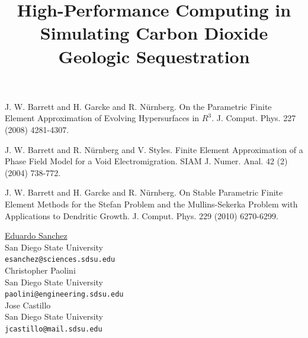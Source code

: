 \documentclass[article, A4, 11pt]{llncs}%
\begin{document}

\begin{thebibliography}{10}
{\sc J. W. Barrett and H. Garcke and R. N\"{u}rnberg}. {On the Parametric Finite Element Approximation of Evolving Hypersurfaces in ${R}^3$}. J. Comput. Phys. 227 (2008) 4281-4307.

{\sc J. W. Barrett and R. N\"{u}rnberg and V. Styles}. {Finite Element Approximation of a Phase Field Model for a Void Electromigration}. SIAM J. Numer. Anal.  42 (2) (2004) 738-772.

{\sc J. W. Barrett and H. Garcke and R. N\"{u}rnberg}. {On Stable Parametric Finite Element Methods for the Stefan Problem and the Mullins-Sekerka Problem with Applications to Dendritic Growth}. J. Comput. Phys. 229 (2010) 6270-6299.
\end{thebibliography} %

\title{High-Performance Computing in Simulating Carbon Dioxide Geologic Sequestration}
 \author{} \institute{}
\maketitle
\begin{center}
{\large \underline{Eduardo Sanchez}}\\
San Diego State University\\
{\tt esanchez@sciences.sdsu.edu}
\\ \vspace{4mm}
{\large Christopher Paolini}\\
San Diego State University\\
{\tt paolini@engineering.sdsu.edu}
\\ \vspace{4mm}
{\large Jose Castillo}\\
San Diego State University\\
{\tt jcastillo@mail.sdsu.edu}
\end{center}
\end{document}
